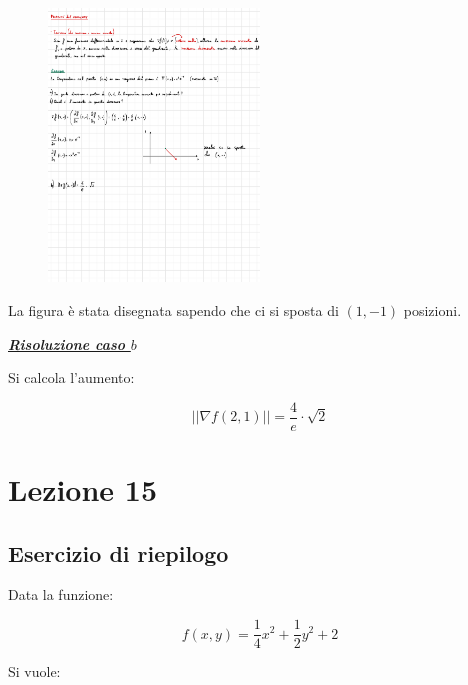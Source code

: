 \documentclass[a4paper]{article}
\begin{document}
	\begin{figure}[!htp]
		\centering
		\includegraphics[width=0.5\textwidth]{img/proprieta_del_gradiente.pdf}
	\end{figure}

	\noindent
	La figura è stata disegnata sapendo che ci si sposta di $\left(1,-1\right)$ posizioni.\newline
	
	\noindent
	\textcolor{Green4}{\textbf{\emph{\underline{Risoluzione caso $b$}}}}\newline
	
	\noindent
	Si calcola l'aumento:
	
	\begin{equation*}
		\Big||\nabla f\left(2,1\right)|\Big| = \dfrac{4}{e} \cdot \sqrt{2}
	\end{equation*}

	\newpage
	
	\section{Lezione 15}
	
	\subsection[Esercizio di riepilogo]{\textcolor{Red3}{Esercizio di riepilogo}}
	
	Data la funzione:
	
	\begin{equation*}
		f\left(x,y\right) = \dfrac{1}{4}x^{2} + \dfrac{1}{2}y^{2} + 2
	\end{equation*}

	\noindent
	Si vuole:
	
\end{document}
